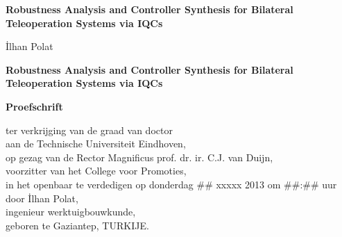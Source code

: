 \newcommand{\thetitle}{Robustness Analysis and Controller Synthesis for Bilateral\\[2mm]Teleoperation Systems via IQCs}
\newcommand{\thesubtitle}{}  
\renewcommand{\theauthor}{İlhan Polat}
\vspace*{30mm}

\thispagestyle{empty}
\begin{center}
    \textbf{\huge \thetitle}\\[\baselineskip]\textbf{\LARGE \thesubtitle}
\end{center}

\vspace{20mm}
\begin{center}
    \Large\theauthor
\end{center}
\newpage

\thispagestyle{empty}
\vspace*{\fill}{\tiny .}

\newpage
\thispagestyle{empty}
\vspace*{30mm}

\begin{center}
     \textbf{\huge \thetitle}
\end{center}

\vspace{30mm}

\begin{center}
    \textbf{Proefschrift}
\end{center}

\smallskip{}


\begin{center}
ter verkrijging van de graad van doctor\\
aan de Technische Universiteit Eindhoven,\\
op gezag van de Rector Magnificus prof. dr. ir. C.J. van Duijn,\\
voorzitter van het College voor Promoties,\\
in het openbaar te verdedigen op donderdag \#\# xxxxx 2013 om \#\#:\#\# uur\\
door \theauthor,\\
ingenieur werktuigbouwkunde,\\
geboren te Gaziantep, TURKIJE.
\end{center}

